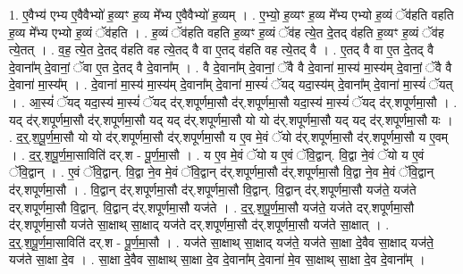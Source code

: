 \documentclass[17pt]{extarticle}
\begin{document}
1. ए॒वैभ्य॑ एभ्य ए॒वैवैभ्यो॑ ह॒व्यꣳ ह॒व्य मे᳚भ्य ए॒वैवैभ्यो॑ ह॒व्यम् । . ए॒भ्यो॒ ह॒व्यꣳ ह॒व्य मे᳚भ्य एभ्यो ह॒व्यं ॅव॑हति वहति ह॒व्य मे᳚भ्य एभ्यो ह॒व्यं ॅव॑हति । . ह॒व्यं ॅव॑हति वहति ह॒व्यꣳ ह॒व्यं ॅव॑ह त्ये॒त दे॒तद् व॑हति ह॒व्यꣳ ह॒व्यं ॅव॑ह त्ये॒तत् । . व॒ह॒ त्ये॒त दे॒तद् व॑हति वह त्ये॒तद् वै वा ए॒तद् व॑हति वह त्ये॒तद् वै । . ए॒तद् वै वा ए॒त दे॒तद् वै दे॒वाना᳚म् दे॒वानां॒ ॅवा ए॒त दे॒तद् वै दे॒वाना᳚म् । . वै दे॒वाना᳚म् दे॒वानां॒ ॅवै वै दे॒वाना॑ मा॒स्य॑ मा॒स्य॑म् दे॒वानां॒ ॅवै वै दे॒वाना॑ मा॒स्य᳚म् । . दे॒वाना॑ मा॒स्य॑ मा॒स्य॑म् दे॒वाना᳚म् दे॒वाना॑ मा॒स्यं॑ ॅयद् यदा॒स्य॑म् दे॒वाना᳚म् दे॒वाना॑ मा॒स्यं॑ ॅयत् । . आ॒स्यं॑ ॅयद् यदा॒स्य॑ मा॒स्यं॑ ॅयद् द॑र्.शपूर्णमा॒सौ द॑र्.शपूर्णमा॒सौ यदा॒स्य॑ मा॒स्यं॑ ॅयद् द॑र्.शपूर्णमा॒सौ । . यद् द॑र्.शपूर्णमा॒सौ द॑र्.शपूर्णमा॒सौ यद् यद् द॑र्.शपूर्णमा॒सौ यो यो द॑र्.शपूर्णमा॒सौ यद् यद् द॑र्.शपूर्णमा॒सौ यः । . द॒र्॒.श॒पू॒र्ण॒मा॒सौ यो यो द॑र्.शपूर्णमा॒सौ द॑र्.शपूर्णमा॒सौ य ए॒व मे॒वं ॅयो द॑र्.शपूर्णमा॒सौ द॑र्.शपूर्णमा॒सौ य ए॒वम् । . द॒र्॒.श॒पू॒र्ण॒मा॒साविति॑ दर्.श - पू॒र्ण॒मा॒सौ । . य ए॒व मे॒वं ॅयो य ए॒वं ॅवि॒द्वान्. वि॒द्वा ने॒वं ॅयो य ए॒वं ॅवि॒द्वान् । . ए॒वं ॅवि॒द्वान्. वि॒द्वा ने॒व मे॒वं ॅवि॒द्वान् द॑र्.शपूर्णमा॒सौ द॑र्.शपूर्णमा॒सौ वि॒द्वा ने॒व मे॒वं ॅवि॒द्वान् द॑र्.शपूर्णमा॒सौ । . वि॒द्वान् द॑र्.शपूर्णमा॒सौ द॑र्.शपूर्णमा॒सौ वि॒द्वान्. वि॒द्वान् द॑र्.शपूर्णमा॒सौ यज॑ते॒ यज॑ते दर्.शपूर्णमा॒सौ वि॒द्वान्. वि॒द्वान् द॑र्.शपूर्णमा॒सौ यज॑ते । . द॒र्॒.श॒पू॒र्ण॒मा॒सौ यज॑ते॒ यज॑ते दर्.शपूर्णमा॒सौ द॑र्.शपूर्णमा॒सौ यज॑ते सा॒क्षाथ् सा॒क्षाद् यज॑ते दर्.शपूर्णमा॒सौ द॑र्.शपूर्णमा॒सौ यज॑ते सा॒क्षात् । . द॒र्॒.श॒पू॒र्ण॒मा॒साविति॑ दर्.श - पू॒र्ण॒मा॒सौ । . यज॑ते सा॒क्षाथ् सा॒क्षाद् यज॑ते॒ यज॑ते सा॒क्षा दे॒वैव सा॒क्षाद् यज॑ते॒ यज॑ते सा॒क्षा दे॒व । . सा॒क्षा दे॒वैव सा॒क्षाथ् सा॒क्षा दे॒व दे॒वाना᳚म् दे॒वाना॑ मे॒व सा॒क्षाथ् सा॒क्षा दे॒व दे॒वाना᳚म् । \newline
\end{document}
